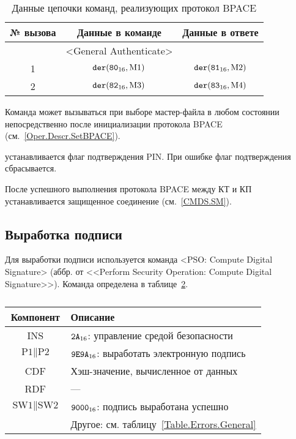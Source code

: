 \begin{table}[hbt]
\caption{Данные цепочки команд, реализующих протокол BPACE}
\label{Table.Oper.BPACE}
\begin{tabular}{|c|c|c|}
\hline
№ вызова & Данные в команде & Данные в ответе\\
\hline
\hline
 & <General Authenticate> &  \\
\hline
\hline
1 & $\texttt{der}(\texttt{80}_{16}, \text{M1})$ & 
$\texttt{der}(\texttt{81}_{16}, \text{M2})$\\
\hline
2 & $\texttt{der}(\texttt{82}_{16}, \text{M3})$ & 
$\texttt{der}(\texttt{83}_{16}, \text{M4})$\\
\hline
\end{tabular}
\end{table}

Команда может вызываться при выборе мастер-файла в любом состоянии
непосредственно после инициализации протокола BPACE 
(см.~\ref{Oper.Descr.SetBPACE}). 

устанавливается флаг подтверждения PIN.
При ошибке флаг подтверждения сбрасывается.

После успешного выполнения протокола BPACE между КТ и КП 
устанавливается защищенное соединение (см.~\ref{CMDS.SM}).

\subsection{Выработка подписи}
\label{Oper.Descr.Signature}

Для выработки подписи используется 
команда <PSO: Compute Digital Signature>
(аббр. от <<Perform Security Operation: Compute Digital Signature>>).
Команда определена в таблице~\ref{Table.Oper.SignatureCmd}.

\begin{table}[hbt]
\caption{}\label{Table.Oper.SignatureCmd}
\begin{tabular}{|c|p{14cm}|}
\hline
Компонент & Описание\\ 
\hline
\hline
INS & $\texttt{2A}_{16}$: управление средой безопасности \\
\hline
$\text{P1} \parallel \text{P2}$ & $\texttt{9E9A}_{16}$: выработать
электронную подпись \\ 
\hline
CDF & Хэш-значение, вычисленное от данных\\
\hline 
RDF &  --- \\
\hline
$\text{SW1} \parallel \text{SW2}$ & 
  $\texttt{9000}_{16}$: подпись выработана успешно \\
\cline{2-2}
  & Другое: см. таблицу~\ref{Table.Errors.General} \\
\hline
\end{tabular}
\end{table}

